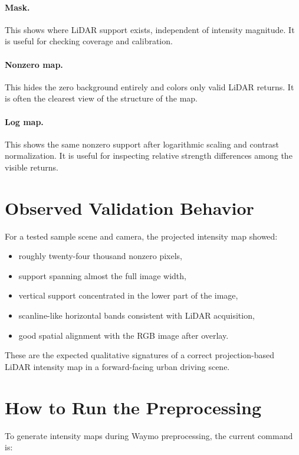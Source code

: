 \documentclass[11pt]{article}
\begin{document}
\paragraph{Mask.}
This shows where LiDAR support exists, independent of intensity magnitude. It is useful for checking coverage and calibration.

\paragraph{Nonzero map.}
This hides the zero background entirely and colors only valid LiDAR returns. It is often the clearest view of the structure of the map.

\paragraph{Log map.}
This shows the same nonzero support after logarithmic scaling and contrast normalization. It is useful for inspecting relative strength differences among the visible returns.

\section{Observed Validation Behavior}
For a tested sample scene and camera, the projected intensity map showed:

\begin{itemize}[leftmargin=1.5em]
    \item roughly twenty-four thousand nonzero pixels,
    \item support spanning almost the full image width,
    \item vertical support concentrated in the lower part of the image,
    \item scanline-like horizontal bands consistent with LiDAR acquisition,
    \item good spatial alignment with the RGB image after overlay.
\end{itemize}

These are the expected qualitative signatures of a correct projection-based LiDAR intensity map in a forward-facing urban driving scene.

\section{How to Run the Preprocessing}
To generate intensity maps during Waymo preprocessing, the current command is:
\end{document}
